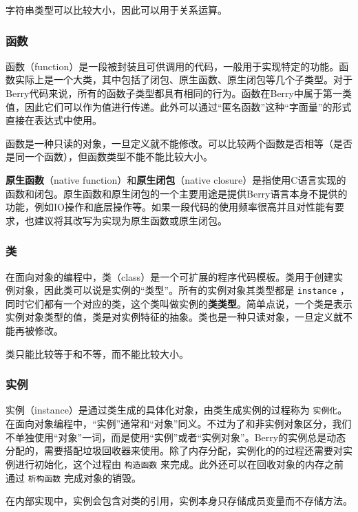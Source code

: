 字符串类型可以比较大小，因此可以用于关系运算。

\subsubsection{函数}

函数（function）是一段被封装且可供调用的代码，一般用于实现特定的功能。函数实际上是一个大类，其中包括了闭包、原生函数、原生闭包等几个子类型。对于Berry代码来说，所有的函数子类型都具有相同的行为。函数在Berry中属于第一类值，因此它们可以作为值进行传递。此外可以通过``匿名函数''这种``字面量''的形式直接在表达式中使用。

函数是一种只读的对象，一旦定义就不能修改。可以比较两个函数是否相等（是否是同一个函数），但函数类型不能不能比较大小。

\textbf{原生函数}（native function）和\textbf{原生闭包}（native closure）是指使用C语言实现的函数和闭包。原生函数和原生闭包的一个主要用途是提供Berry语言本身不提供的功能，例如IO操作和底层操作等。如果一段代码的使用频率很高并且对性能有要求，也建议将其改写为实现为原生函数或原生闭包。

\subsubsection{类}

在面向对象的编程中，类（class）是一个可扩展的程序代码模板。类用于创建实例对象，因此类可以说是实例的``类型''。所有的实例对象其类型都是 \texttt{instance} ，同时它们都有一个对应的类，这个类叫做实例的\textbf{类类型}。简单点说，一个类是表示实例对象类型的值，类是对实例特征的抽象。类也是一种只读对象，一旦定义就不能再被修改。

类只能比较等于和不等，而不能比较大小。

\subsubsection{实例}

实例（instance）是通过类生成的具体化对象，由类生成实例的过程称为 \texttt{实例化}。在面向对象编程中，``实例''通常和``对象''同义。不过为了和非实例对象区分，我们不单独使用``对象''一词，而是使用``实例''或者``实例对象''。Berry的实例总是动态分配的，需要搭配垃圾回收器来使用。除了内存分配，实例化的的过程还需要对实例进行初始化，这个过程由 \texttt{构造函数} 来完成。此外还可以在回收对象的内存之前通过 \texttt{析构函数} 完成对象的销毁。

在内部实现中，实例会包含对类的引用，实例本身只存储成员变量而不存储方法。

